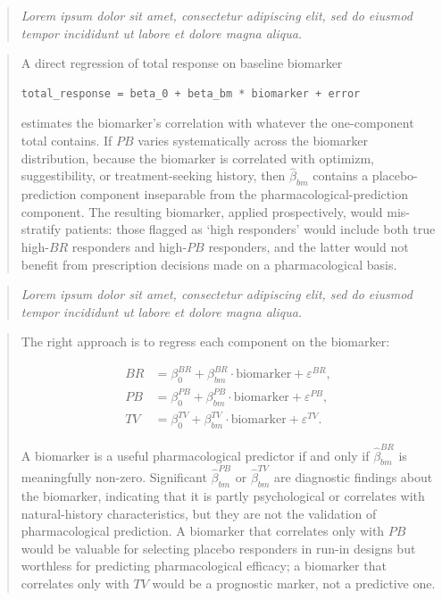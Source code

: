\documentclass[
  11pt,
]{article}
\newenvironment{rgt}{%
  \begin{quote}\small\itshape\color[RGB]{20,60,160}}{%
  \end{quote}}
\newenvironment{orig}{%
  \begin{quote}\normalsize\color[gray]{0.55}}{%
  \end{quote}}
\begin{document}
\begin{rgt}
Lorem ipsum dolor sit amet, consectetur adipiscing elit, sed do eiusmod tempor incididunt ut labore et dolore magna aliqua.

\end{rgt}

\begin{orig}
A direct regression of total response on baseline biomarker

\begin{verbatim}
total_response = beta_0 + beta_bm * biomarker + error
\end{verbatim}

estimates the biomarker's correlation with whatever the one-component
total contains. If \(PB\) varies systematically across the
biomarker distribution, because the biomarker is correlated
with optimizm, suggestibility, or treatment-seeking history,
then \(\hat{\beta}_{bm}\) contains a placebo-prediction component
inseparable from the pharmacological-prediction component. The
resulting biomarker, applied prospectively, would mis-stratify
patients: those flagged as `high responders' would include both
true high-\(BR\) responders and high-\(PB\) responders, and the
latter would not benefit from prescription decisions made on a
pharmacological basis.

\end{orig}

\begin{rgt}
Lorem ipsum dolor sit amet, consectetur adipiscing elit, sed do eiusmod tempor incididunt ut labore et dolore magna aliqua.

\end{rgt}

\begin{orig}
The right approach is to regress each component on the
biomarker:

\begin{align*}
BR &= \beta_0^{BR} + \beta_{bm}^{BR} \cdot \mathrm{biomarker} +
\varepsilon^{BR},\\
PB &= \beta_0^{PB} + \beta_{bm}^{PB} \cdot \mathrm{biomarker} +
\varepsilon^{PB},\\
TV &= \beta_0^{TV} + \beta_{bm}^{TV} \cdot \mathrm{biomarker} +
\varepsilon^{TV}.
\end{align*}

A biomarker is a useful pharmacological predictor if and only
if \(\hat{\beta}_{bm}^{BR}\) is meaningfully non-zero. Significant
\(\hat{\beta}_{bm}^{PB}\) or \(\hat{\beta}_{bm}^{TV}\) are
diagnostic findings about the biomarker, indicating that it is
partly psychological or correlates with natural-history
characteristics, but they are not the validation of
pharmacological prediction. A biomarker that correlates only
with \(PB\) would be valuable for selecting placebo responders in
run-in designs but worthless for predicting pharmacological
efficacy; a biomarker that correlates only with \(TV\) would be
a prognostic marker, not a predictive one.

\end{orig}
\end{document}
